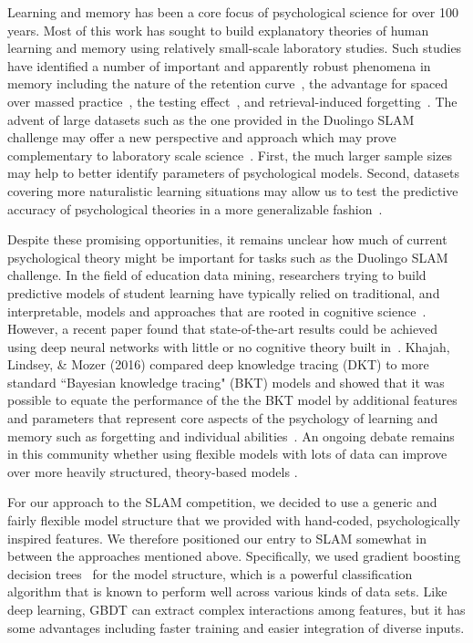 \documentclass[11pt,a4paper]{article}
\begin{document}
Learning and memory has been a core focus of psychological science for
over 100 years. Most of this work has sought to build explanatory theories of human learning
and memory using relatively small-scale laboratory studies.  Such studies have
identified a number of important and apparently robust phenomena in memory including
the nature of the retention curve~\cite{Rubin:1996aa}, the advantage for spaced over massed 
practice~\cite{Ruth:1928aa,Cepeda:2006aa,Mozer:2009cs}, the testing effect~\cite{Roediger2006te},
and retrieval-induced forgetting~\cite{Anderson1994rif}.
The advent of large datasets such as the one provided in the Duolingo SLAM challenge
may offer a new perspective and approach which may prove complementary
to laboratory scale science~\cite{Griffiths:2015aa,Goldstone:2016aa}.  First, the much
larger sample sizes may help to better identify parameters of psychological models.
Second, datasets covering more naturalistic learning situations may allow us to test 
the predictive accuracy of psychological theories in a more generalizable fashion~\cite{Yarkoni:2017aa}.

Despite these promising opportunities, it remains unclear how much of current psychological
theory might be important for tasks such as the Duolingo SLAM challenge.
In the field of education data mining, researchers trying to build
predictive models of student learning have typically relied on traditional, and interpretable, models and approaches
that are rooted in cognitive science~\cite[e.g.,][]{Atkinson:1972rm,Atkinson:1972rz,Corbett1995bkt,Pavlik:2008rm}.
However, a recent paper found that state-of-the-art results could be achieved using deep neural networks with
little or no cognitive theory built in~\cite[so called ``deep knowledge tracing",][]{Piech:2015aa}.
Khajah, Lindsey, \& Mozer (2016) compared deep knowledge tracing (DKT) to more
standard ``Bayesian knowledge tracing" (BKT) models and showed
that it was possible to equate the performance of the the BKT model by additional 
features and parameters that represent core aspects of the psychology of learning
and memory such as forgetting and individual abilities~\cite{Khajah2016hdnt}. An ongoing debate remains in this community 
whether using flexible models with lots of data can improve over more heavily structured, theory-based models \cite{Tang:2016:DNN, xiong2016going, zhang2017incorporating}.

For our approach to the SLAM competition, we decided to use a generic and fairly flexible model structure that we provided with hand-coded, psychologically inspired features.
We therefore positioned our entry to SLAM somewhat in between the approaches mentioned above.
Specifically, we used gradient boosting decision trees~\cite[GBDT,][]{ke2017lightgbm} for the model structure, which is a powerful classification algorithm that is known to perform well across various kinds of data sets.  Like
deep learning, GBDT can extract complex interactions among features,
but it has some advantages including faster training and easier integration of
diverse inputs. 
\end{document}
